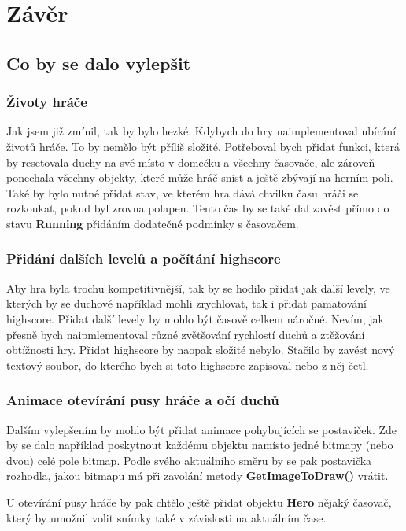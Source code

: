 \documentclass[a4]{article}
\begin{document}
\section{Závěr}
\subsection{Co by se dalo vylepšit}
\subsubsection{Životy hráče}
Jak jsem již zmínil, tak by bylo hezké. Kdybych do hry naimplementoval ubírání životů hráče. To by nemělo být příliš složité. Potřeboval bych přidat funkci, která by resetovala duchy na své místo v domečku a všechny časovače, ale zároveň ponechala všechny objekty, které může hráč sníst a ještě zbývají na herním poli. Také by bylo nutné přidat stav, ve kterém hra dává chvilku času hráči se rozkoukat, pokud byl zrovna polapen. Tento čas by se také dal zavést přímo do stavu \textbf{Running} přidáním dodatečné podmínky s časovačem.

\subsubsection{Přidání dalších levelů a počítání highscore}
Aby hra byla trochu kompetitivnější, tak by se hodilo přidat jak další levely, ve kterých by se duchové například mohli zrychlovat, tak i přidat pamatování highscore. Přidat další levely by mohlo být časově celkem náročné. Nevím, jak přesně bych naipmlementoval různé zvětšování rychlostí duchů a ztěžování obtížnosti hry. Přidat highscore by naopak složité nebylo. Stačilo by zavést nový textový soubor, do kterého bych si toto highscore zapisoval nebo z něj četl.

\subsubsection{Animace otevírání pusy hráče a očí duchů}
Dalším vylepšením by mohlo být přidat animace pohybujících se postaviček. Zde by se dalo například poskytnout každému objektu namísto jedné bitmapy (nebo dvou) celé pole bitmap. Podle svého aktuálního směru by se pak postavička rozhodla, jakou bitmapu má při zavolání metody \textbf{GetImageToDraw()} vrátit.

U otevírání pusy hráče by pak chtělo ještě přidat objektu \textbf{Hero} nějaký časovač, který by umožnil volit snímky také v závislosti na aktuálním čase.
\end{document}
